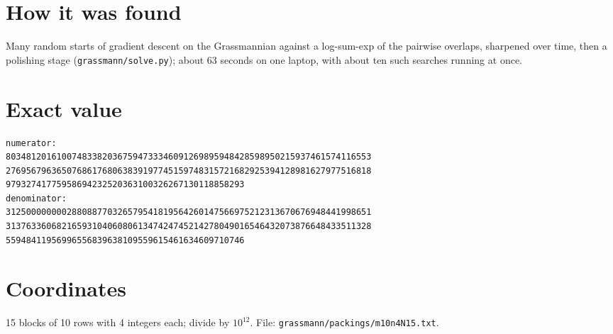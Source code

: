 \documentclass[11pt,a4paper]{article}
\begin{document}
\section{How it was found}
Many random starts of gradient descent on the Grassmannian against a log-sum-exp of the pairwise overlaps, sharpened over time, then a polishing stage (\texttt{grassmann/solve.py}); about 63 seconds on one laptop, with about ten such searches running at once.


\appendix
\section{Exact value}
{\small
\begin{verbatim}
numerator:
803481201610074833820367594733346091269895948428598950215937461574116553
276956796365076861768063839197745159748315721682925394128981627977516818
97932741775958694232520363100326267130118858293
denominator:
312500000000288088770326579541819564260147566975212313670676948441998651
313763360682165931040608061347424745214278049016546432073876648433511328
55948411956996556839638109559615461634609710746
\end{verbatim}}

\section{Coordinates}
15 blocks of 10 rows with 4 integers each; divide by $10^{12}$. File: \texttt{grassmann/packings/m10n4N15.txt}.
{\tiny
\begin{multicols}{3}
\end{multicols}}
\end{document}
